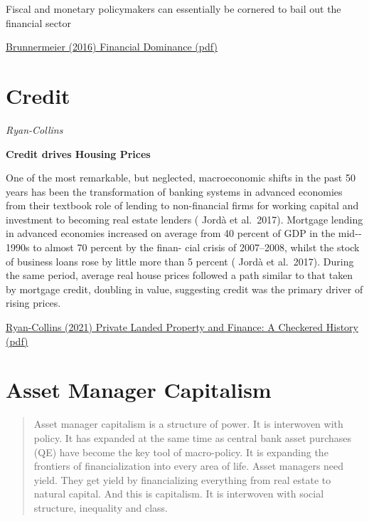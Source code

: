 \documentclass[
]{book}
\begin{document}
Fiscal and monetary policymakers can essentially be
cornered to bail out the financial sector

\href{pdf/Brunnermeier_2016_Financial_Dominance.pdf}{Brunnermeier (2016) Financial Dominance (pdf)}

\hypertarget{credit}{%
\section{Credit}\label{credit}}

\emph{Ryan-Collins}

\textbf{Credit drives Housing Prices}

One of the most remarkable, but
neglected, macroeconomic shifts in the past 50 years has been the
transformation of banking systems in advanced economies from their
textbook role of lending to non-­financial firms for working capital
and investment to becoming real estate lenders ( Jordà et al.~2017).
Mortgage lending in advanced economies increased on average from
40 percent of GDP in the mid-­1990s to almost 70 percent by the finan-
cial crisis of 2007--­2008, whilst the stock of business loans rose by
little more than 5 percent ( Jordà et al.~2017). During the same period,
average real house prices followed a path similar to that taken by
mortgage credit, doubling in value, suggesting credit was the primary
driver of rising prices.

\href{https://onlinelibrary.wi\%20ley.com/doi/10.1111/ajes.12387}{Ryan-Collins (2021) Private Landed Property and Finance: A Checkered History}
\href{pdf/Ryan-Collins_2021_Private_Landed_Property_and_Finance.pdf}{(pdf)}

\hypertarget{asset-manager-capitalism}{%
\section{Asset Manager Capitalism}\label{asset-manager-capitalism}}

\begin{quote}
Asset manager capitalism is a structure of power. It is interwoven with policy. It has expanded at the same time as central bank asset purchases (QE) have become the key tool of macro-policy. It is expanding the frontiers of financialization into every area of life. Asset managers need yield. They get yield by financializing everything from real estate to natural capital. And this is capitalism. It is interwoven with social structure, inequality and class.
\end{quote}
\end{document}
